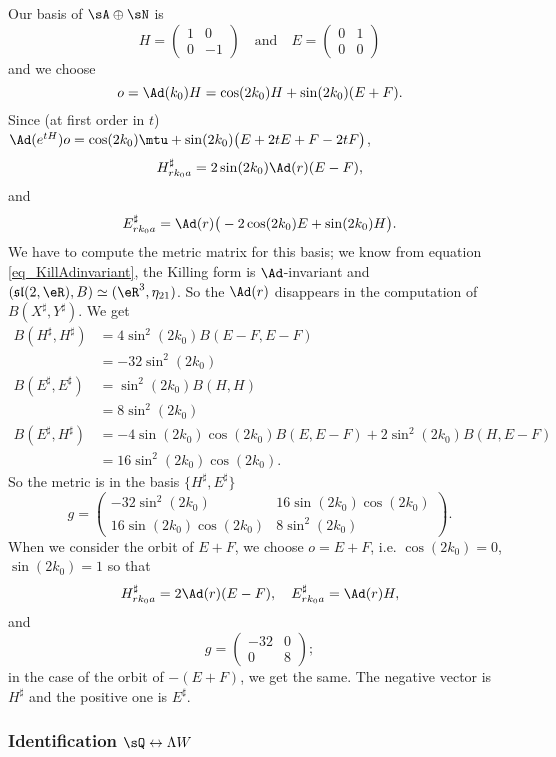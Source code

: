 Our basis of $\sA\oplus\sN$ is
\[ 
  H=\begin{pmatrix}
1&0\\0&-1
\end{pmatrix}\quad\text{and}\quad
E=\begin{pmatrix}
0&1\\0&0
\end{pmatrix}
\]
and we choose
\[ 
  o=\Ad(k_0)H=\cos(2k_0)H+\sin(2k_0)(E+F).
\]
Since (at first order in $t$) $\Ad( e^{tH})o=\cos(2k_0)\mtu+\sin(2k_0)\big( E+2tE+F-2tF \big)$,
\[ 
  H^{\sharp}_{rk_0a}=2\sin(2k_0)\Ad(r)(E-F),
\]
and
\[ 
  E^{\sharp}_{rk_0a}=\Ad(r)\big( -2\cos(2k_0)E+\sin(2k_0)H \big).
\]
We have to compute the metric matrix for this basis; we know from equation \eqref{eq_KillAdinvariant}, the Killing form is $\Ad$-invariant and $(\mathfrak{sl}(2,\eR),B)\simeq(\eR^3,\eta_{21})$. So the $\Ad(r)$ disappears in the computation of $B(X^{\sharp},Y^{\sharp})$. We get
\[
\begin{split}
B(H^{\sharp},H^{\sharp})&=4\sin^2(2k_0)B(E-F,E-F)\\
        &=-32\sin^2(2k_0)\\
B(E^{\sharp},E^{\sharp})&=\sin^2(2k_0)B(H,H)\\
        &=8\sin^2(2k_0)\\
B(E^{\sharp},H^{\sharp})&=-4\sin(2k_0)\cos(2k_0)B(E,E-F)+2\sin^2(2k_0)B(H,E-F)\\
        &=16\sin^2(2k_0)\cos(2k_0).
\end{split}
\]
So the metric is in the basis $\{ H^{\sharp},E^{\sharp} \}$
\begin{equation}
g=
\begin{pmatrix}
-32\sin^2(2k_0) & 16\sin(2k_0)\cos(2k_0)\\
16\sin(2k_0)\cos(2k_0) & 8\sin^2(2k_0)
\end{pmatrix}.
\end{equation}
When we consider the orbit of $E+F$, we choose $o=E+F$, i.e. $\cos(2k_0)=0$, $\sin(2k_0)=1$ so that
\begin{equation}
H^{\sharp}_{rk_0a}=2\Ad(r)(E-F),\quad E^{\sharp}_{rk_0a}=\Ad(r)H,
\end{equation}
and
\[ 
  g=\begin{pmatrix}
-32&0\\0&8
\end{pmatrix};
\]
in the case of the orbit of $-(E+F)$, we get the same. The negative vector is $H^{\sharp}$ and the positive one is $E^{\sharp}$.

\subsubsection{Identification \texorpdfstring{$\sQ\leftrightarrow\Lambda W$}{QW}}

